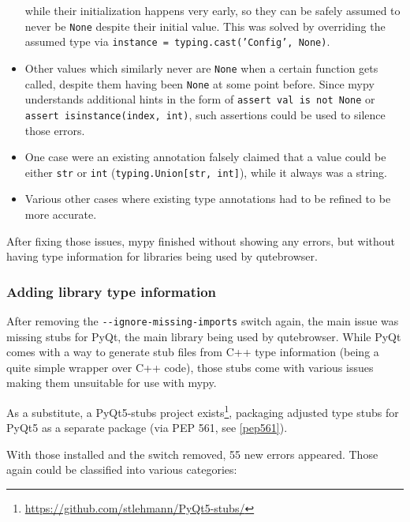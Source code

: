 \documentclass[a4paper,parskip=full]{scrreprt}
\newcommand{\py}[1]{\texttt{#1}}
\begin{document}
\begin{itemize}
    while their initialization happens very early, so they can be safely assumed
    to never be \py{None} despite their initial value. This was solved by
    overriding the assumed type via \py{instance = typing.cast('Config', None)}.
  \item Other values which similarly never are \py{None} when a certain function
    gets called, despite them having been \py{None} at some point before. Since
    mypy understands additional hints in the form of \py{assert val is not
      None} or \py{assert isinstance(index, int)}, such assertions could be used
    to silence those errors.
  \item One case were an existing annotation falsely claimed that a value could
    be either \py{str} or \py{int} (\py{typing.Union[str, int]}), while it
    always was a string.
  \item Various other cases where existing type annotations had to be refined to
    be more accurate.
\end{itemize}

After fixing those issues, mypy finished without showing any errors, but without
having type information for libraries being used by qutebrowser.

\subsubsection{Adding library type information}

After removing the \verb|--ignore-missing-imports| switch again, the main issue
was missing stubs for PyQt, the main library being used by qutebrowser. While
PyQt comes with a way to generate stub files from C++ type information (being a
quite simple wrapper over C++ code), those stubs come with various issues making
them unsuitable for use with mypy.

As a substitute, a PyQt5-stubs project
exists\footnote{\url{https://github.com/stlehmann/PyQt5-stubs/}}, packaging
adjusted type stubs for PyQt5 as a separate package (via PEP 561, see
\ref{pep561}).

With those installed and the switch removed, 55 new errors appeared. Those again
could be classified into various categories:
\end{document}
